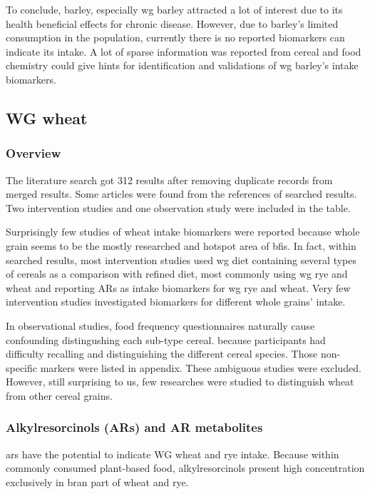 To conclude, barley, especially \acrshort{wg} barley attracted a lot of interest due to its health beneficial effects for chronic disease. However, due to barley's limited consumption in the population, currently there is no reported biomarkers can indicate its intake. A lot of sparse information was reported from cereal and food chemistry could give hints for identification and validations of \acrshort{wg} barley's intake biomarkers.

\subsection{WG wheat}
\subsubsection{Overview}
The literature search got 312 results after removing duplicate records from merged results. Some articles were found from the references of searched results. Two intervention studies and one observation study were included in the table. 

Surprisingly few studies of wheat intake biomarkers were reported because whole grain seems to be the mostly researched and hotspot area of \acrshort{bfis}. In fact, within searched results, most intervention studies used \acrshort{wg} diet containing several types of cereals as a comparison with refined diet, most commonly using \acrshort{wg} rye and wheat and reporting ARs as intake biomarkers for \acrshort{wg} rye and wheat. Very few intervention studies investigated biomarkers for different whole grains' intake. 

In observational studies, food frequency questionnaires naturally cause confounding distingushing each sub-type cereal. 
because participants had difficulty recalling and distinguishing the different cereal species.
Those non-specific markers were listed in appendix. 
These ambiguous studies were excluded.
However, still surprising to us, few researches were studied to distinguish wheat from other cereal grains.


\subsubsection{Alkylresorcinols (ARs) and AR metabolites}
\acrfull{ars} have the potential to indicate WG wheat and rye intake. Because within commonly consumed plant-based food, alkylresorcinols present high concentration exclusively in bran part of wheat and rye. 

